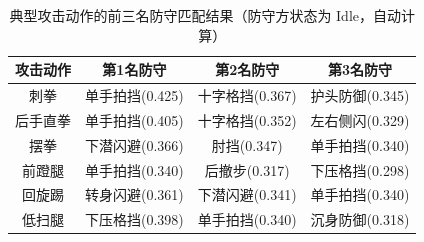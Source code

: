 \begin{table}[H]
\centering
\caption{典型攻击动作的前三名防守匹配结果（防守方状态为 Idle，自动计算）}
\label{tab:typical_defense_match}
\begin{tabular}{c|c|c|c}
\hline
攻击动作 & 第1名防守 & 第2名防守 & 第3名防守 \\
\hline
刺拳 & 单手拍挡(0.425) & 十字格挡(0.367) & 护头防御(0.345) \\
后手直拳 & 单手拍挡(0.405) & 十字格挡(0.352) & 左右侧闪(0.329) \\
摆拳 & 下潜闪避(0.366) & 肘挡(0.347) & 单手拍挡(0.340) \\
前蹬腿 & 单手拍挡(0.340) & 后撤步(0.317) & 下压格挡(0.298) \\
回旋踢 & 转身闪避(0.361) & 下潜闪避(0.341) & 单手拍挡(0.340) \\
低扫腿 & 下压格挡(0.398) & 单手拍挡(0.340) & 沉身防御(0.318) \\
\hline
\end{tabular}
\end{table}
